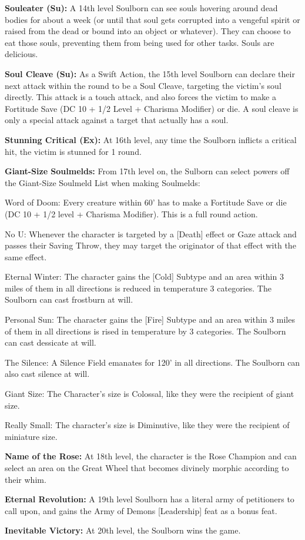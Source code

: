 \textbf{Souleater (Su):} A 14th level Soulborn can see souls hovering around dead bodies for about a week (or until that soul gets corrupted into a vengeful spirit or raised from the dead or bound into an object or whatever). They can choose to eat those souls, preventing them from being used for other tasks. Souls are delicious. 

\textbf{Soul Cleave (Su):} As a Swift Action, the 15th level Soulborn can declare their next attack within the round to be a Soul Cleave, targeting the victim's soul directly. This attack is a touch attack, and also forces the victim to make a Fortitude Save (DC 10 + 1/2 Level + Charisma Modifier) or die. A soul cleave is only a special attack against a target that actually has a soul. 

\textbf{Stunning Critical (Ex):} At 16th level, any time the Soulborn inflicts a critical hit, the victim is stunned for 1 round. 

\textbf{Giant-Size Soulmelds:} From 17th level on, the Sulborn can select powers off the Giant-Size Soulmeld List when making Soulmelds: 
\begin{itemize*}
\item Word of Doom: Every creature within 60' has to make a Fortitude Save or die (DC 10 + 1/2 level + Charisma Modifier). This is a full round action. 
\item No U: Whenever the character is targeted by a [Death] effect or Gaze attack and passes their Saving Throw, they may target the originator of that effect with the same effect. 
\item Eternal Winter: The character gains the [Cold] Subtype and an area within 3 miles of them in all directions is reduced in temperature 3 categories. The Soulborn can cast frostburn at will. 
\item Personal Sun: The character gains the [Fire] Subtype and an area within 3 miles of them in all directions is rised in temperature by 3 categories. The Soulborn can cast dessicate at will. 
\item The Silence: A Silence Field emanates for 120' in all directions. The Soulborn can also cast silence at will. 
\item Giant Size: The Character's size is Colossal, like they were the recipient of giant size. 
\item Really Small: The character's size is Diminutive, like they were the recipient of miniature size. 
\end{itemize*}

\textbf{Name of the Rose:} At 18th level, the character is the Rose Champion and can select an area on the Great Wheel that becomes divinely morphic according to their whim.

\textbf{Eternal Revolution:} A 19th level Soulborn has a literal army of petitioners to call upon, and gains the Army of Demons [Leadership] feat as a bonus feat. 

\textbf{Inevitable Victory:} At 20th level, the Soulborn wins the game. 